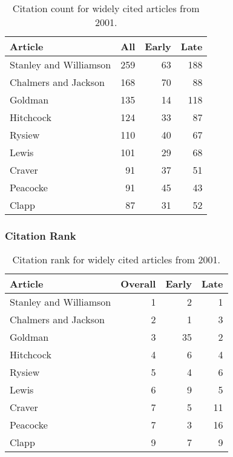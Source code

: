 \documentclass[
  10pt,
  letterpaper,
  DIV=11,
  numbers=noendperiod,
  twoside]{scrartcl}
\begin{document}
\begin{longtable}[]{@{}lrrr@{}}

\caption{\label{tbl-citation-count-2001}Citation count for widely cited
articles from 2001.}

\tabularnewline

\toprule\noalign{}
Article & All & Early & Late \\
\midrule\noalign{}
\endhead
\bottomrule\noalign{}
\endlastfoot
Stanley and Williamson & 259 & 63 & 188 \\
Chalmers and Jackson & 168 & 70 & 88 \\
Goldman & 135 & 14 & 118 \\
Hitchcock & 124 & 33 & 87 \\
Rysiew & 110 & 40 & 67 \\
Lewis & 101 & 29 & 68 \\
Craver & 91 & 37 & 51 \\
Peacocke & 91 & 45 & 43 \\
Clapp & 87 & 31 & 52 \\

\end{longtable}

\subsubsection*{Citation Rank}\label{sec-rank-2001}

\begin{longtable}[]{@{}lrrr@{}}

\caption{\label{tbl-citation-rank-2001}Citation rank for widely cited
articles from 2001.}

\tabularnewline

\toprule\noalign{}
Article & Overall & Early & Late \\
\midrule\noalign{}
\endhead
\bottomrule\noalign{}
\endlastfoot
Stanley and Williamson & 1 & 2 & 1 \\
Chalmers and Jackson & 2 & 1 & 3 \\
Goldman & 3 & 35 & 2 \\
Hitchcock & 4 & 6 & 4 \\
Rysiew & 5 & 4 & 6 \\
Lewis & 6 & 9 & 5 \\
Craver & 7 & 5 & 11 \\
Peacocke & 7 & 3 & 16 \\
Clapp & 9 & 7 & 9 \\

\end{longtable}
\end{document}

